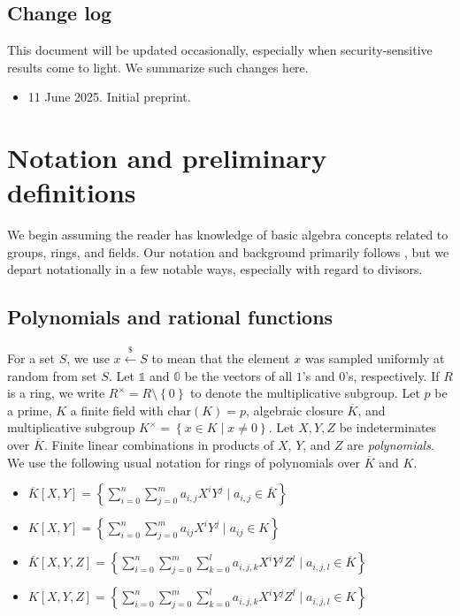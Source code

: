 \documentclass[11pt,letterpaper]{article}
\newcommand{\polys}{K[X,Y]}
\theoremstyle{definition}
\newcommand{\6}{\mathbf}
\newcommand{\7}{\mathcal}
\newcommand{\lsamp}{\xleftarrow{\$}}
\newcommand{\one}{\mathbb{1}}
\newcommand{\zero}{\mathbb{0}}
\begin{document}
\subsection{Change log}

This document will be updated occasionally, especially when security-sensitive results come to light. We summarize such changes here.
\begin{itemize}
\item 11 June 2025. Initial preprint.
\end{itemize}


\section{Notation and preliminary definitions}

We begin assuming the reader has knowledge of basic algebra concepts related to groups, rings, and fields. Our notation and background primarily follows \cite{Silverman}, but we depart notationally in a few notable ways, especially with regard to divisors.

\subsection{Polynomials and rational functions}

For a set $S$, we use $x \lsamp S$ to mean that the element $x$ was sampled uniformly at random from set $S$.
Let $\one$ and $\zero$ be the vectors of all $1$'s and $0$'s, respectively.
If $R$ is a ring, we write $R^\times = R\setminus\left\{0\right\}$ to denote the multiplicative subgroup. 
Let $p$ be a prime, $K$ a finite field with $\text{char}(K) = p$, algebraic closure $\overline{K}$, and multiplicative subgroup $K^\times = \left\{x \in K \mid x \neq 0\right\}$. Let $X, Y, Z$ be indeterminates over $\overline{K}$. Finite linear combinations in products of $X$, $Y$, and $Z$ are \textit{polynomials}. We use the following usual notation for rings of polynomials over $\overline{K}$ and $K$.
\begin{itemize}

\item  $\overline{K}[X,Y] = \left\{\sum_{i=0}^{n}\sum_{j=0}^{m} a_{i,j} X^i Y^j \mid a_{i,j} \in \overline{K}\right\}$

\item $\polys = \left\{\sum_{i=0}^{n}\sum_{j=0}^{m}a_{ij} X^iY^j \mid a_{ij} \in K\right\}$

\item  $\overline{K}[X,Y,Z] = \left\{\sum_{i=0}^{n}\sum_{j=0}^{m} \sum_{k=0}^{l} a_{i,j,k} X^i Y^j Z^l \mid a_{i,j,l} \in \overline{K}\right\}$

\item $K[X,Y,Z] = \left\{\sum_{i=0}^{n}\sum_{j=0}^{m} \sum_{k=0}^{l} a_{i,j,k} X^i Y^j Z^l \mid a_{i,j,l} \in K\right\}$

\end{itemize}  
\end{document}
